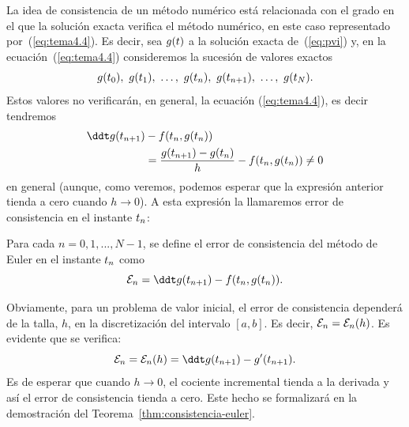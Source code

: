 La idea de consistencia de un método numérico está relacionada con el
grado en el que la solución exacta verifica el método numérico, en este caso representado por~(\ref{eq:tema4.4}). Es decir,
sea $g(t)$ a la solución exacta de~(\ref{eq:pvi}) y, en la
ecuación~(\ref{eq:tema4.4}) consideremos la sucesión de valores exactos
$$
g(t_0),\ g(t_1),\ \dots,\ g({t_n}),\ g({t_{n+1}}),\ \dots,\ g(t_N).
$$
Estos valores no verificarán, en general, la ecuación
(\ref{eq:tema4.4}), es decir tendremos
\begin{align*}
  \ddt \sol(\tnn) &- f(\tn,\sol(\tn))
  \\
  &= \frac{\sol(\tnn)-\sol(\tn)}{h}
  - f(\tn,\sol(\tn))
    \neq 0
\end{align*}
en general (aunque, como veremos, podemos esperar que la expresión anterior tienda a cero cuando $h\to 0$).
A esta expresión la llamaremos error de consistencia en el instante ${t_n}$:
\begin{definition}
  \label{def:error-consistencia-euler}
  Para cada $n=0,1,...,N-1$, se define el error de consistencia del método de
  Euler en el instante ${t_n}$ como
  \begin{equation}
    \label{eq:consistencia-euler}
    \errCons_{n} = \ddt \sol(\tnn)-f(\tn,\sol(\tn)).
  \end{equation}
\end{definition}
\begin{remark}
  Obviamente, para un problema de valor inicial, el error de
  consistencia dependerá de la talla, $h$, en la discretización del
  intervalo $[a,b]$. Es decir, ${\cal E}_n={\cal E}_n(h)$.
  Es evidente que se verifica:
  $$\errCons_{n} = \errCons_{n}(h) = \ddt \sol(\tnn)-\sol'(\tnn).$$
  Es de esperar que cuando $h\to 0$, el cociente incremental tienda a
  la derivada y así el error de consistencia tienda a cero. Este hecho
  se formalizará en la demostración del
  Teorema~\ref{thm:consistencia-euler}.
\end{remark}

